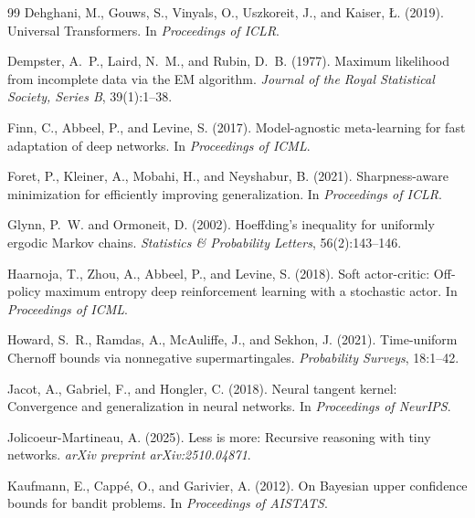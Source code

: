 \documentclass[12pt,a4paper]{article}
\begin{document}
\begin{thebibliography}{99}
Dehghani, M., Gouws, S., Vinyals, O., Uszkoreit, J., and Kaiser, \L{}. (2019).
\newblock Universal Transformers.
\newblock In \emph{Proceedings of ICLR}.

Dempster, A.~P., Laird, N.~M., and Rubin, D.~B. (1977).
\newblock Maximum likelihood from incomplete data via the EM algorithm.
\newblock \emph{Journal of the Royal Statistical Society, Series B}, 39(1):1--38.

Finn, C., Abbeel, P., and Levine, S. (2017).
\newblock Model-agnostic meta-learning for fast adaptation of deep networks.
\newblock In \emph{Proceedings of ICML}.

Foret, P., Kleiner, A., Mobahi, H., and Neyshabur, B. (2021).
\newblock Sharpness-aware minimization for efficiently improving generalization.
\newblock In \emph{Proceedings of ICLR}.

Glynn, P.~W. and Ormoneit, D. (2002).
\newblock Hoeffding's inequality for uniformly ergodic Markov chains.
\newblock \emph{Statistics \& Probability Letters}, 56(2):143--146.

Haarnoja, T., Zhou, A., Abbeel, P., and Levine, S. (2018).
\newblock Soft actor-critic: Off-policy maximum entropy deep reinforcement
  learning with a stochastic actor.
\newblock In \emph{Proceedings of ICML}.

Howard, S.~R., Ramdas, A., McAuliffe, J., and Sekhon, J. (2021).
\newblock Time-uniform Chernoff bounds via nonnegative supermartingales.
\newblock \emph{Probability Surveys}, 18:1--42.

Jacot, A., Gabriel, F., and Hongler, C. (2018).
\newblock Neural tangent kernel: Convergence and generalization in neural
  networks.
\newblock In \emph{Proceedings of NeurIPS}.

Jolicoeur-Martineau, A. (2025).
\newblock Less is more: Recursive reasoning with tiny networks.
\newblock \emph{arXiv preprint arXiv:2510.04871}.

Kaufmann, E., Capp\'{e}, O., and Garivier, A. (2012).
\newblock On Bayesian upper confidence bounds for bandit problems.
\newblock In \emph{Proceedings of AISTATS}.


\end{thebibliography}
\end{document}
